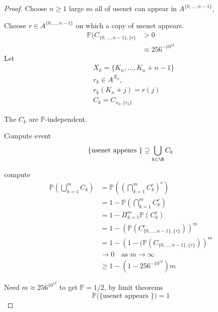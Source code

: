 \begin{proof}
	Choose $n \geq 1$ large so all of usenet can appear in $A ^{\{0,\ldots,n-1\}}$,

	Choose  $r \in A^{\{0,\ldots,n-1\}} $ on which a copy of usenet appears.
	\begin{align*}
		\mathbb{P}(C_{\{0,\ldots, n-1\}, \{r\}} &> 0 \\
												&\approx 256^{-10^{12}}
	\end{align*}
	Let
	\begin{align*}
		&X_k = \{ K_n, \ldots, K_n + n-1 \} \\
		&r_k \in A^{X_k}, \\
		&r_k(K_n + j) = r(j) \\
		&C_k = C_{x_k, \{r_k\}}
	\end{align*}
	
	The $C_k$ are $\mathbb{P}$-independent.

	Compute event 
	\[
		\{\text{usenet appears \}} \contains \bigcup_{k \in \N} C_k
	\] 
	 
	compute
	\begin{align*}
		\mathbb{P}( \bigcup_{k=1}^{m} C_k ) &= \mathbb{P}((\bigcap_{k=1}^{m} C_{k}^c )^c) \\
											&= 1 - \mathbb{P} ( \bigcap_{k=1}^{m} C_{k}^c ) \\
											&= 1 - \Pi_{k=1}^{m} \mathbb{P}(C_k^c) \\
											&= 1 - \left(\mathbb{P}(C^c_{\{0, \ldots, n-1\}, \{r\}})\right)^m \\
											&= 1 - \left(1 - (\mathbb{P}(C_{\{0, \ldots, n-1\}, \{r\}})\right)^m \\
											&\to 0 \quad \text{as } m\to \infty \\
											&\geq 1 - (1 - 256^{-10^12})m
	\end{align*} 

	Need $m \approx 256^{10^{12}}$ to get $\mathbb{P} = 1/2$, by limit theorems
	\[
		\mathbb{P}(\{\text{usenet appears \})} = 1
	\] 
\end{proof}

